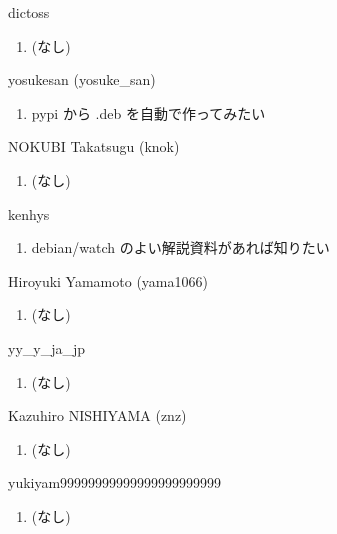 \begin{prework}{ dictoss }
  \begin{enumerate}
  \item (なし)
  \end{enumerate}
\end{prework}

\begin{prework}{ yosukesan (yosuke\_san) }
  \begin{enumerate}
  \item pypi から .deb を自動で作ってみたい
  \end{enumerate}
\end{prework}

\begin{prework}{ NOKUBI Takatsugu (knok) }
  \begin{enumerate}
  \item (なし)
  \end{enumerate}
\end{prework}

\begin{prework}{ kenhys }
  \begin{enumerate}
  \item debian/watch のよい解説資料があれば知りたい
  \end{enumerate}
\end{prework}

\begin{prework}{ Hiroyuki Yamamoto (yama1066) }
  \begin{enumerate}
  \item (なし)
  \end{enumerate}
\end{prework}

\begin{prework}{ yy\_y\_ja\_jp }
  \begin{enumerate}
  \item (なし)
  \end{enumerate}
\end{prework}

\begin{prework}{ Kazuhiro NISHIYAMA (znz) }
  \begin{enumerate}
  \item (なし)
  \end{enumerate}
\end{prework}

\begin{prework}{ yukiyam99999999999999999999999 }
  \begin{enumerate}
  \item (なし)
  \end{enumerate}
\end{prework}
